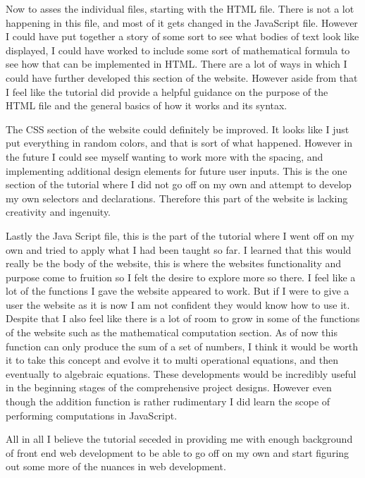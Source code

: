 \documentclass[10pt,twocolumn]{article}
\begin{document}
Now to asses the individual files, starting with the HTML file. There is not a lot happening in this file, and most of it gets changed in the JavaScript file. However I could have put together a story of some sort to see what bodies of text look like displayed, I could have worked to include some sort of mathematical formula to see how that can be implemented in HTML. There are a lot of ways in which I could have further developed this section of the website. However aside from that I feel like the tutorial did provide a helpful guidance on the purpose of the HTML file and the general basics of how it works and its syntax.  

The CSS section of the website could definitely be improved. It looks like I just put everything in random colors, and that is sort of what happened. However in the future I could see myself wanting to work more with the spacing, and implementing additional design elements for future user inputs. This is the one section of the tutorial where I did not go off on my own and attempt to develop my own selectors and declarations. Therefore this part of the website is lacking creativity and ingenuity. 

Lastly the Java Script file, this is the part of the tutorial where I went off on my own and tried to apply what I had been taught so far. I learned that this would really be the body of the website, this is where the websites functionality and purpose come to fruition so I felt the desire to explore more so there. I feel like a lot of the functions I gave the website appeared to work. But if I were to give a user the website as it is now I am not confident they would know how to use it. Despite that I also feel like there is a lot of room to grow in some of the functions of the website such as the mathematical computation section. As of now this function can only produce the sum of a set of numbers, I think it would be worth it to take this concept and evolve it to multi operational equations, and then eventually to algebraic equations. These developments would be incredibly useful in the beginning stages of the comprehensive project designs. However even though the addition function is rather rudimentary I did learn the scope of performing computations in JavaScript.

All in all I believe the tutorial seceded in providing me with enough background of front end web development to be able to go off on my own and start figuring out some more of the nuances in web development. 
\end{document}
